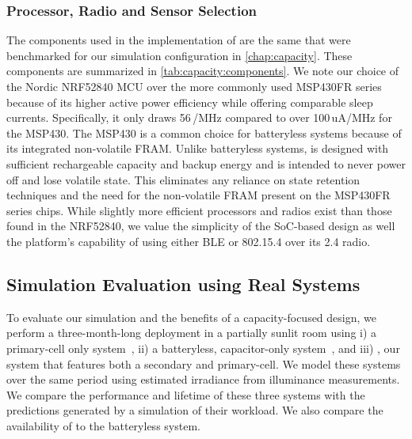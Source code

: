 \subsubsection{Processor, Radio and Sensor Selection}
The components used in the implementation of \name are the same that were benchmarked for our simulation configuration in \cref{chap:capacity}.
These components are summarized in \cref{tab:capacity:components}.
We note our choice of the Nordic NRF52840 MCU over the more commonly used MSP430FR series
because of its higher active power efficiency while offering comparable sleep currents.
Specifically, it only draws 56\,\uA/MHz compared to over 100\,uA/MHz
for the MSP430.
The MSP430 is a common choice for batteryless systems because of its integrated non-volatile FRAM. 
Unlike batteryless systems,
\name is designed with sufficient rechargeable capacity and backup energy and is intended to never power off and lose volatile state. 
This eliminates any reliance on state retention techniques and the need for the non-volatile FRAM present on the MSP430FR series chips. 
While
slightly more efficient
processors and radios exist than those found in the NRF52840,
we value the simplicity of the SoC-based design as well the platform's capability of using either BLE or 802.15.4 over its 2.4\ssi{\giga\hertz} radio.  

\subsection{Simulation Evaluation using Real Systems}
\label{sec:eval}
To evaluate our simulation and the benefits of a capacity-focused design, 
we perform a three-month-long deployment in a partially sunlit room
using i) a primary-cell only system~\cite{adkins2015michigan}, ii) a batteryless, capacitor-only system~\cite{campbellEnergy14}, and iii) \name, our
system that features both a secondary and primary-cell. 
We model these
systems over the same period using estimated irradiance from \name illuminance measurements. 
We compare the performance and lifetime of these three systems with the predictions generated by a simulation of their workload. 
We also compare the availability of \name to the batteryless system.


